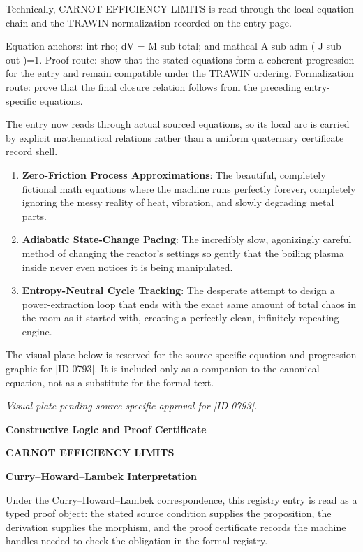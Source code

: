 Technically, CARNOT EFFICIENCY LIMITS is read through the local equation chain and the TRAWIN normalization recorded on the entry page.

Equation anchors: int rho; dV = M sub total; and mathcal A sub adm ( J sub out )=1. Proof route: show that the stated equations form a coherent progression for the entry and remain compatible under the TRAWIN ordering. Formalization route: prove that the final closure relation follows from the preceding entry-specific equations.

The entry now reads through actual sourced equations, so its local arc is carried by explicit mathematical relations rather than a uniform quaternary certificate record shell.
\endgroup

\begin{enumerate}[leftmargin=1.6em,itemsep=6pt,topsep=4pt]
\item \textbf{Zero-Friction Process Approximations}: The beautiful, completely fictional math equations where the machine runs perfectly forever, completely ignoring the messy reality of heat, vibration, and slowly degrading metal parts.
\item \textbf{Adiabatic State-Change Pacing}: The incredibly slow, agonizingly careful method of changing the reactor's settings so gently that the boiling plasma inside never even notices it is being manipulated.
\item \textbf{Entropy-Neutral Cycle Tracking}: The desperate attempt to design a power-extraction loop that ends with the exact same amount of total chaos in the room as it started with, creating a perfectly clean, infinitely repeating engine.
\end{enumerate}

\begingroup\footnotesize\sloppy
The visual plate below is reserved for the source-specific equation and progression graphic for [ID 0793]. It is included only as a companion to the canonical equation, not as a substitute for the formal text.
\par\endgroup
\begingroup\footnotesize\itshape
Visual plate pending source-specific approval for [ID 0793].
\par\endgroup

\clearpage
\begingroup\tzpsupportsetup
\noindent\textbf{\fontsize{10.8pt}{12.8pt}\selectfont [ID 0793] Constructive Logic and Proof Certificate}\par
\noindent\textbf{\fontsize{10pt}{12pt}\selectfont CARNOT EFFICIENCY LIMITS}\par
\vspace{0.45em}
\begingroup
\footnotesize
\setlength{\parskip}{0.22em}
\setlength{\parindent}{0pt}
\noindent\textbf{Curry--Howard--Lambek Interpretation}\par
Under the Curry--Howard--Lambek correspondence, this registry entry is read as a typed proof
object: the stated source condition supplies the proposition, the derivation supplies the
morphism, and the proof certificate records the machine handles needed to check the obligation
in the formal registry.


